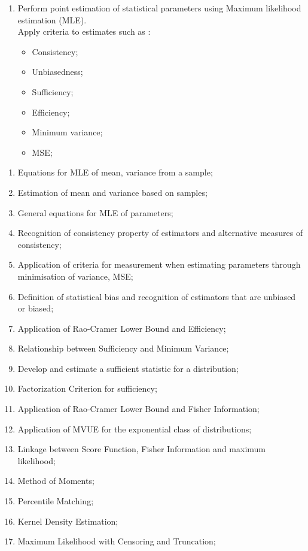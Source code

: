 \begin{outcomes}
	\begin{enumerate}
	\item	Perform point estimation of statistical parameters using Maximum likelihood estimation (MLE). \\
			Apply criteria to estimates such as :
	\begin{multicols*}{2}
		\begin{itemize}
		\item	Consistency;
		\item	Unbiasedness;
		\item	Sufficiency;
		\item	Efficiency;
		\item	Minimum variance;
		\item	MSE;
		\end{itemize}
	\end{multicols*}
	\end{enumerate}
\end{outcomes}
\begin{knowledge}
	\begin{enumerate}[label = \alph*.]
	\item	Equations for MLE of mean, variance from a sample;
	\item	Estimation of mean and variance based on samples;
	\item	General equations for MLE of parameters;
	\item	Recognition of consistency property of estimators and alternative measures of consistency;
	\item	Application of criteria for measurement when estimating parameters through minimisation of variance, MSE;
	\item	Definition of statistical bias and recognition of estimators that are unbiased or biased;
	\item	Application of Rao-Cramer Lower Bound and Efficiency;
	\item	Relationship between Sufficiency and Minimum Variance;
	\item	Develop and estimate a sufficient statistic for a distribution;
	\item	Factorization Criterion for sufficiency;
	\item	Application of Rao-Cramer Lower Bound and Fisher Information;
	\item	Application of MVUE for the exponential class of distributions;
	\item	Linkage between Score Function, Fisher Information and maximum likelihood;
	\item	Method of Moments;
	\item	Percentile Matching;
	\item	Kernel Density Estimation;
	\item	Maximum Likelihood with Censoring and Truncation;
	\end{enumerate}
\end{knowledge}

